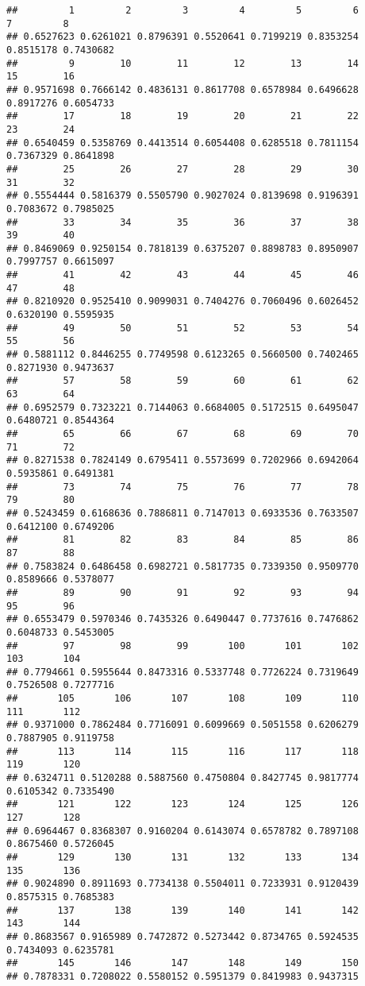 \documentclass[
]{article}
\begin{document}
\begin{verbatim}
##         1         2         3         4         5         6         7         8 
## 0.6527623 0.6261021 0.8796391 0.5520641 0.7199219 0.8353254 0.8515178 0.7430682 
##         9        10        11        12        13        14        15        16 
## 0.9571698 0.7666142 0.4836131 0.8617708 0.6578984 0.6496628 0.8917276 0.6054733 
##        17        18        19        20        21        22        23        24 
## 0.6540459 0.5358769 0.4413514 0.6054408 0.6285518 0.7811154 0.7367329 0.8641898 
##        25        26        27        28        29        30        31        32 
## 0.5554444 0.5816379 0.5505790 0.9027024 0.8139698 0.9196391 0.7083672 0.7985025 
##        33        34        35        36        37        38        39        40 
## 0.8469069 0.9250154 0.7818139 0.6375207 0.8898783 0.8950907 0.7997757 0.6615097 
##        41        42        43        44        45        46        47        48 
## 0.8210920 0.9525410 0.9099031 0.7404276 0.7060496 0.6026452 0.6320190 0.5595935 
##        49        50        51        52        53        54        55        56 
## 0.5881112 0.8446255 0.7749598 0.6123265 0.5660500 0.7402465 0.8271930 0.9473637 
##        57        58        59        60        61        62        63        64 
## 0.6952579 0.7323221 0.7144063 0.6684005 0.5172515 0.6495047 0.6480721 0.8544364 
##        65        66        67        68        69        70        71        72 
## 0.8271538 0.7824149 0.6795411 0.5573699 0.7202966 0.6942064 0.5935861 0.6491381 
##        73        74        75        76        77        78        79        80 
## 0.5243459 0.6168636 0.7886811 0.7147013 0.6933536 0.7633507 0.6412100 0.6749206 
##        81        82        83        84        85        86        87        88 
## 0.7583824 0.6486458 0.6982721 0.5817735 0.7339350 0.9509770 0.8589666 0.5378077 
##        89        90        91        92        93        94        95        96 
## 0.6553479 0.5970346 0.7435326 0.6490447 0.7737616 0.7476862 0.6048733 0.5453005 
##        97        98        99       100       101       102       103       104 
## 0.7794661 0.5955644 0.8473316 0.5337748 0.7726224 0.7319649 0.7526508 0.7277716 
##       105       106       107       108       109       110       111       112 
## 0.9371000 0.7862484 0.7716091 0.6099669 0.5051558 0.6206279 0.7887905 0.9119758 
##       113       114       115       116       117       118       119       120 
## 0.6324711 0.5120288 0.5887560 0.4750804 0.8427745 0.9817774 0.6105342 0.7335490 
##       121       122       123       124       125       126       127       128 
## 0.6964467 0.8368307 0.9160204 0.6143074 0.6578782 0.7897108 0.8675460 0.5726045 
##       129       130       131       132       133       134       135       136 
## 0.9024890 0.8911693 0.7734138 0.5504011 0.7233931 0.9120439 0.8575315 0.7685383 
##       137       138       139       140       141       142       143       144 
## 0.8683567 0.9165989 0.7472872 0.5273442 0.8734765 0.5924535 0.7434093 0.6235781 
##       145       146       147       148       149       150 
## 0.7878331 0.7208022 0.5580152 0.5951379 0.8419983 0.9437315
\end{verbatim}
\end{document}
